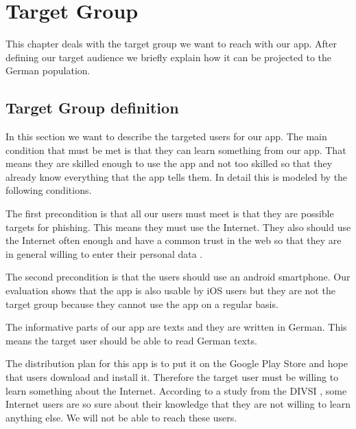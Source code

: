 \section{Target Group}
\label{s:target_group}
This chapter deals with the target group we want to reach with our app.
After defining our target audience we briefly explain how it can be projected to the German population.

\subsection{Target Group definition}
In this section we want to describe the targeted users for our app.
The main condition that must be met is that they can learn something from our app.
That means they are skilled enough to use the app and not too skilled so that they already know everything that the app tells them.
In detail this is modeled by the following conditions.
\begin{description}[leftmargin=0cm]
\item[Attackability] The first precondition is that all our users must meet is that they are possible targets for phishing.
This means they must use the Internet.
They also should use the Internet often enough and have a common trust in the web so that they are in general willing to enter their personal data \cite{divsi2012divsi}.

\item[Android Users] The second precondition is that the users should use an android smartphone.
Our evaluation shows that the app is also usable by iOS users but they are not the target group because they cannot use the app on a regular basis.
\item[Language] The informative parts of our app are texts and they are written in German.
This means the target user should be able to read German texts.
\item[Motivation] The distribution plan for this app is to put it on the Google Play Store and hope that users download and install it.
Therefore the target user must be willing to learn something about the Internet. According to a study from the DIVSI \cite{divsi2012divsi}, some Internet users are so sure about their knowledge that they are not willing to learn anything else.
We will not be able to reach these users.
\end{description}

